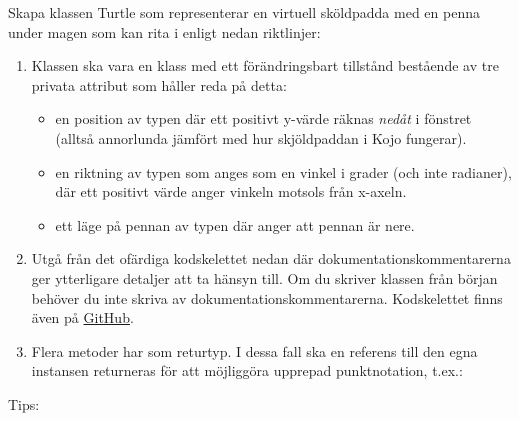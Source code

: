 \Task Skapa klassen Turtle som representerar en virtuell sköldpadda med en penna under magen som kan rita i  enligt nedan riktlinjer:

\begin{enumerate}
\item Klassen  ska vara en klass med ett förändringsbart tillstånd bestående av tre privata attribut som håller reda på detta:

\begin{itemize}
\item en position av typen  där ett positivt y-värde räknas \emph{nedåt} i fönstret (alltså annorlunda jämfört med hur skjöldpaddan i Kojo fungerar).
\item en riktning av typen  som anges som en vinkel i grader  (och inte radianer), där ett positivt värde anger vinkeln motsols från x-axeln.
\item ett läge på pennan av typen  där  anger att pennan är nere.
\end{itemize}

\item Utgå från det ofärdiga kodskelettet nedan där dokumentationskommentarerna ger ytterligare detaljer att ta hänsyn till. Om du skriver klassen från början behöver du inte skriva av dokumentationskommentarerna. Kodskelettet finns även på \href{https://github.com/lunduniversity/introprog/blob/master/workspace/}{GitHub}.

\item Flera metoder har  som returtyp. I dessa fall ska en referens till den egna instansen returneras för att möjliggöra upprepad punktnotation, t.ex.:\\

\end{enumerate}

\noindent Tips:

